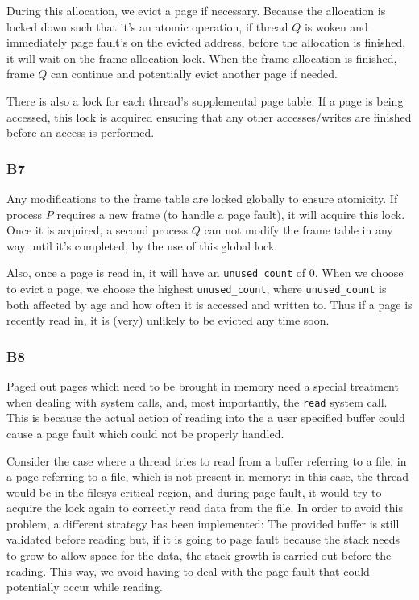 \documentclass[a4wide, 11pt]{article}
\newcommand{\tx}{\texttt}
\begin{document}
During this allocation, we evict a page if necessary. Because the allocation is locked down such that it's an atomic operation, if thread $Q$ is woken and immediately page fault's on the evicted address, before the allocation is finished, it will wait on the frame allocation lock. When the frame allocation is finished, frame $Q$ can continue and potentially evict another page if needed.

There is also a lock for each thread's supplemental page table. If a page is being accessed, this lock is acquired ensuring that any other accesses/writes are finished before an access is performed.

\subsubsection{B7}

Any modifications to the frame table are locked globally to ensure atomicity. If process $P$ requires a new frame (to handle a page fault), it will acquire this lock. Once it is acquired, a second process $Q$ can not modify the frame table in any way until it's completed, by the use of this global lock.

Also, once a page is read in, it will have an \tx{unused\_count} of 0. When we choose to evict a page, we choose the highest \tx{unused\_count}, where \tx{unused\_count} is both affected by age and how often it is accessed and written to. Thus if a page is recently read in, it is (very) unlikely to be evicted any time soon.

\subsubsection{B8}
Paged out pages which need to be brought in memory need a special treatment when dealing with system calls, and, most importantly, the \tx{read} system call. This is because the actual action of reading into the a user specified buffer could cause a page fault which could not be properly handled.

Consider the case where a thread tries to read from a buffer referring to a file, in a page referring to a file, which is not present in memory: in this case, the thread would be in the filesys critical region, and during page fault, it would try to acquire the lock again to correctly read data from the file. In order to avoid this problem, a different strategy has been implemented: The provided buffer is still validated before reading but, if it is going to page fault because the stack needs to grow to allow space for the data, the stack growth is carried out before the reading. This way, we avoid having to deal with the page fault that could potentially occur while reading.  
\end{document}
